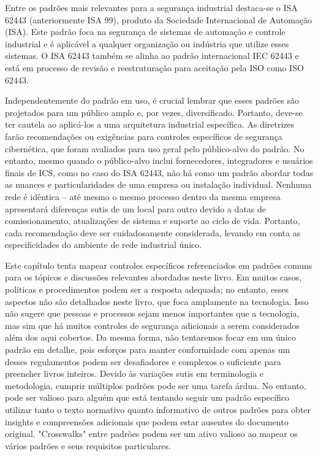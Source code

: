 Entre os padrões mais relevantes para a segurança industrial destaca-se o ISA 62443 (anteriormente ISA 99), produto da Sociedade Internacional de Automação (ISA). Este padrão foca na segurança de sistemas de automação e controle industrial e é aplicável a qualquer organização ou indústria que utilize esses sistemas. O ISA 62443 também se alinha ao padrão internacional IEC 62443 e está em processo de revisão e reestruturação para aceitação pela ISO como ISO 62443.

Independentemente do padrão em uso, é crucial lembrar que esses padrões são projetados para um público amplo e, por vezes, diversificado. Portanto, deve-se ter cautela ao aplicá-los a uma arquitetura industrial específica. As diretrizes farão recomendações ou exigências para controles específicos de segurança cibernética, que foram avaliados para uso geral pelo público-alvo do padrão. No entanto, mesmo quando o público-alvo inclui fornecedores, integradores e usuários finais de ICS, como no caso do ISA 62443, não há como um padrão abordar todas as nuances e particularidades de uma empresa ou instalação individual. Nenhuma rede é idêntica – até mesmo o mesmo processo dentro da mesma empresa apresentará diferenças sutis de um local para outro devido a datas de comissionamento, atualizações de sistema e suporte ao ciclo de vida. Portanto, cada recomendação deve ser cuidadosamente considerada, levando em conta as especificidades do ambiente de rede industrial único.

Este capítulo tenta mapear controles específicos referenciados em padrões comuns para os tópicos e discussões relevantes abordados neste livro. Em muitos casos, políticas e procedimentos podem ser a resposta adequada; no entanto, esses aspectos não são detalhados neste livro, que foca amplamente na tecnologia. Isso não sugere que pessoas e processos sejam menos importantes que a tecnologia, mas sim que há muitos controles de segurança adicionais a serem considerados além dos aqui cobertos. Da mesma forma, não tentaremos focar em um único padrão em detalhe, pois esforços para manter conformidade com apenas um desses regulamentos podem ser desafiadores e complexos o suficiente para preencher livros inteiros. Devido às variações sutis em terminologia e metodologia, cumprir múltiplos padrões pode ser uma tarefa árdua. No entanto, pode ser valioso para alguém que está tentando seguir um padrão específico utilizar tanto o texto normativo quanto informativo de outros padrões para obter insights e compreensões adicionais que podem estar ausentes do documento original. "Crosswalks" entre padrões podem ser um ativo valioso ao mapear os vários padrões e seus requisitos particulares.

